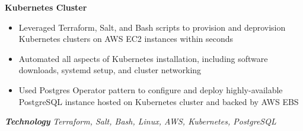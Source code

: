 \documentclass[10pt,letterpaper]{moderncv}
\begin{document}
\vspace{0.4em}

{\fontsize{9}{10.8}\selectfont\bfseries\textcolor[rgb]{0,0,1}{Kubernetes Cluster}}
\begin{itemize}
  \item Leveraged Terraform, Salt, and Bash scripts to provision and deprovision Kubernetes clusters on AWS EC2 instances within seconds
  \item Automated all aspects of Kubernetes installation, including software downloads, systemd setup, and cluster networking
  \item Used Postgres Operator pattern to configure and deploy highly-available PostgreSQL instance hosted on Kubernetes cluster and backed by AWS EBS
\end{itemize}
\vspace{0.2em}
\textbf{\textit{Technology}} \textit{Terraform, Salt, Bash, Linux, AWS, Kubernetes, PostgreSQL}
\end{document}
